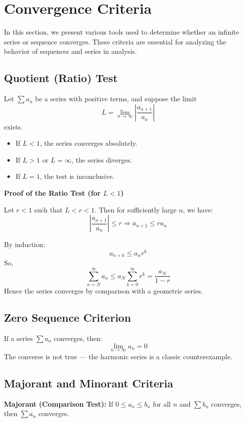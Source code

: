 \section{Convergence Criteria}

In this section, we present various tools used to determine whether an infinite series or sequence converges. These criteria are essential for analyzing the behavior of sequences and series in analysis.

\subsection{Quotient (Ratio) Test}

Let \(\sum a_n\) be a series with positive terms, and suppose the limit
\[
L = \lim_{n \to \infty} \left| \frac{a_{n+1}}{a_n} \right|
\]
exists.

\begin{itemize}[label=\(-\)]
\item If \(L < 1\), the series converges absolutely.
\item If \(L > 1\) or \(L = \infty\), the series diverges.
\item If \(L = 1\), the test is inconclusive.
\end{itemize}

\textbf{Proof of the Ratio Test (for \(L < 1\))}

Let \(r < 1\) such that \(L < r < 1\). Then for sufficiently large \(n\), we have:
\[
\left| \frac{a_{n+1}}{a_n} \right| \le r \Rightarrow a_{n+1} \le r a_n
\]

By induction:
\[
a_{n+k} \le a_n r^k
\]
So,
\[
\sum_{n=N}^\infty a_n \le a_N \sum_{k=0}^\infty r^k = \frac{a_N}{1 - r}
\]
Hence the series converges by comparison with a geometric series.

\subsection{Zero Sequence Criterion}

If a series \(\sum a_n\) converges, then:
\[
\lim_{n \to \infty} a_n = 0
\]
The converse is not true — the harmonic series is a classic counterexample.

\subsection{Majorant and Minorant Criteria}

\textbf{Majorant (Comparison Test):} If \(0 \le a_n \le b_n\) for all \(n\) and \(\sum b_n\) converges, then \(\sum a_n\) converges.

